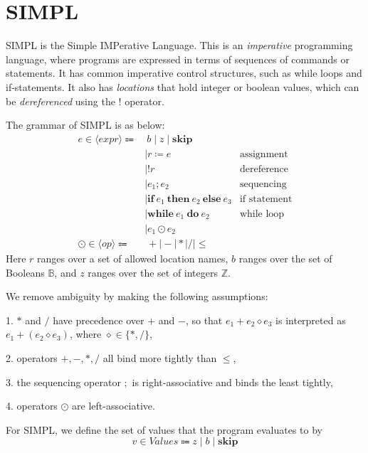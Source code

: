 \section{SIMPL}
SIMPL is the Simple IMPerative Language. This is an \textit{imperative} programming language, where programs are expressed in terms of sequences of commands or statements. It has common imperative control structures, such as while loops and if-statements. It also has \textit{locations} that hold integer or boolean values, which can be \textit{dereferenced} using the \(!\) operator. 

The grammar of SIMPL is as below:
\[
\begin{aligned}
  e \in \langle expr \rangle \Coloneqq &\ b \mid z \mid \mathbf{skip} \\
  &\mid r \coloneqq e & \text{assignment} \\
  &\mid !r & \text{dereference} \\
  &\mid e_1; e_2 & \text{sequencing} \\
  &\mid \mathbf{if}\ e_1\ \mathbf{then}\ e_2\ \mathbf{else}\ e_3 & \text{if statement} \\
  &\mid \mathbf{while}\ e_1\ \mathbf{do}\ e_2 & \text{while loop} \\
  &\mid e_1 \odot e_2 \\
  \odot \in \langle op \rangle \Coloneqq &\ + \mid - \mid * \mid / \mid \le
\end{aligned}
\]
Here \(r\) ranges over a set of allowed location names, \(b\) ranges over the set of Booleans \(\mathbb{B}\), and \(z\) ranges over the set of integers \(\mathbb{Z}\).

We remove ambiguity by making the following assumptions: 

1. \(*\) and \(/\) have precedence over \(+\) and \(-\), so that \(e_1 + e_2 \diamond e_3\) is interpreted as \(e_1 + (e_2 \diamond e_3)\), where \(\diamond \in \{*, /\}\),

2. operators \(+, -, *, /\) all bind more tightly than \(\le\),

3. the sequencing operator \(;\) is right-associative and binds the least tightly,

4. operators \(\odot\) are left-associative. 

For SIMPL, we define the set of values that the program evaluates to by 
\[
  v \in \textit{Values} \Coloneqq z \mid b \mid \mathbf{skip} 
\]

